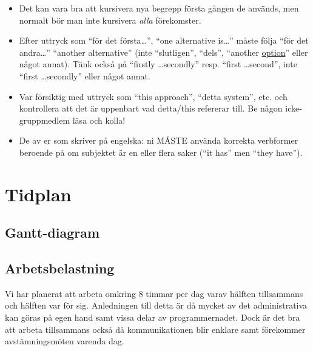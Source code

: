 \documentclass[a4paper,12pt]{article}
\begin{document}
\begin{itemize}
\item    Det kan vara bra att kursivera nya begrepp första gången de används, men normalt bör man inte kursivera \emph{alla} förekomster.

\item    Efter uttryck som ``för det första\ldots'', ``one alternative is\ldots'' måste följa ``för det andra\ldots'' ``another alternative'' (inte ``slutligen'', ``dels'', ``another \underline{option}'' eller något annat).  Tänk också på ``firstly \ldots secondly'' resp. ``first \ldots second'', inte ``first \ldots secondly'' eller något annat.

\item    Var försiktig med uttryck som ``this approach'', ``detta system'', etc. och kontrollera att det är uppenbart vad detta/this refererar till. Be någon icke-gruppmedlem läsa och kolla!

\item    De av er som skriver på engelska: ni MÅSTE använda korrekta verbformer beroende på om subjektet är en eller flera saker (``it has'' men ``they have'').
\end{itemize}

\section{Tidplan}
\subsection{Gantt-diagram}

\subsection{Arbetsbelastning}
Vi har planerat att arbeta omkring 8 timmar per dag varav hälften tillsammans och hälften var för sig. Anledningen till detta är då mycket av det administrativa kan göras på egen hand samt vissa delar av programmernadet. Dock är det bra att arbeta tillsammans också då kommunikationen blir enklare samt förekommer avstämningsmöten varenda dag.
\end{document}
